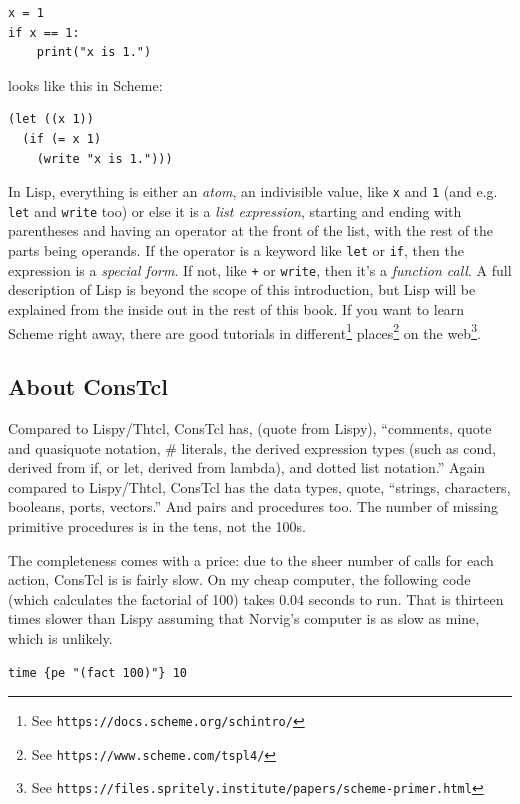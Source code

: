 \documentclass[twoside,9pt]{report}
\begin{document}
\begin{verbatim}
x = 1
if x == 1:
    print("x is 1.")
\end{verbatim}

\noindent looks like this in Scheme:

\begin{verbatim}
(let ((x 1))
  (if (= x 1)
    (write "x is 1.")))
\end{verbatim}

In Lisp, everything is either an \emph{atom}, an indivisible value, like
\texttt{x} and \texttt{1} (and e.g. \texttt{let} and \texttt{write} too) or
else it is a \emph{list expression}, starting and ending with parentheses and
having an operator at the front of the list, with the rest of the parts being
operands. If the operator is a keyword like \texttt{let} or \texttt{if}, then
the expression is a \emph{special form}. If not, like \texttt{+} or
\texttt{write}, then it's a \emph{function call}.  A full description of Lisp
is beyond the scope of this introduction, but Lisp will be explained from the
inside out in the rest of this book. If you want to learn Scheme right away,
there are good tutorials in different\footnote{See
\texttt{https://docs.scheme.org/schintro/}} places\footnote{See
\texttt{https://www.scheme.com/tspl4/}} on the web\footnote{See
\texttt{https://files.spritely.institute/papers/scheme-primer.html}}.

\subsection{About ConsTcl}
\label{about-constcl}

Compared to Lispy/Thtcl, ConsTcl has, (quote from Lispy), ``comments, quote and
quasiquote notation, \# literals, the derived expression types (such as cond,
derived from if, or let, derived from lambda), and dotted list notation.''
Again compared to Lispy/Thtcl, ConsTcl has the data types, quote, ``strings,
characters, booleans, ports, vectors.'' And pairs and procedures too. The
number of missing primitive procedures is in the tens, not the 100s. 

The completeness comes with a price: due to the sheer number of calls for each
action, ConsTcl is is fairly slow. On my cheap computer, the following code
(which calculates the factorial of 100) takes 0.04 seconds to run. That is thirteen
times slower than Lispy assuming that Norvig's computer is as slow as mine,
which is unlikely.

\begin{verbatim}
time {pe "(fact 100)"} 10
\end{verbatim}
\end{document}
